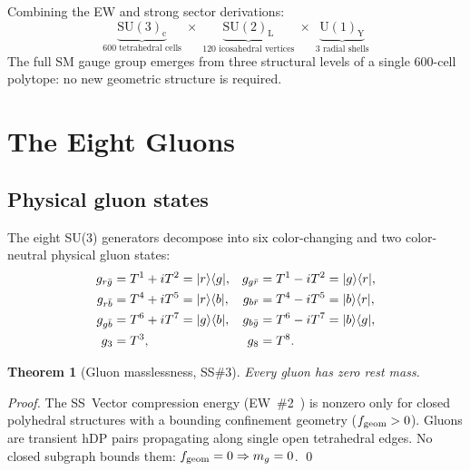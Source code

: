 \documentclass[11pt,letterpaper]{article}
\newtheorem{theorem}{Theorem}[section]
\newcommand{\ket}[1]{|#1\rangle}
\newcommand{\bra}[1]{\langle#1|}
\begin{document}
Combining the EW and strong sector derivations:
\begin{equation}
\underbrace{\mathrm{SU(3)_c}}_{\text{600 tetrahedral cells}}
\;\times\;
\underbrace{\mathrm{SU(2)_L}}_{\text{120 icosahedral vertices}}
\;\times\;
\underbrace{\mathrm{U(1)_Y}}_{\text{3 radial shells}}
\label{eq:SM_gauge}
\end{equation}
The full SM gauge group emerges from three structural levels of a
single 600-cell polytope: no new geometric structure is required.

\section{The Eight Gluons}
\label{sec:gluons}

\subsection{Physical gluon states}

The eight SU(3) generators decompose into six color-changing and
two color-neutral physical gluon states:
\begin{align}
g_{r\bar{g}} &= T^1+iT^2 = \ket{r}\bra{g}, &
g_{g\bar{r}} &= T^1-iT^2 = \ket{g}\bra{r}, \notag\\
g_{r\bar{b}} &= T^4+iT^5 = \ket{r}\bra{b}, &
g_{b\bar{r}} &= T^4-iT^5 = \ket{b}\bra{r}, \notag\\
g_{g\bar{b}} &= T^6+iT^7 = \ket{g}\bra{b}, &
g_{b\bar{g}} &= T^6-iT^7 = \ket{b}\bra{g}, \notag\\
g_3 &= T^3, & g_8 &= T^8. \label{eq:gluons}
\end{align}

\begin{theorem}[Gluon masslessness, SS\#3]
\label{thm:massless}
Every gluon has zero rest mass.
\end{theorem}

\begin{proof}
The SS~Vector compression energy (EW~\#2~\citep{cpp_ew2})
is nonzero only for closed polyhedral structures with a bounding
confinement geometry ($f_{\rm geom} > 0$).  Gluons are transient
hDP pairs propagating along single open tetrahedral edges.  No
closed subgraph bounds them: $f_{\rm geom} = 0 \Rightarrow m_g = 0$.
\qed
\end{proof}
\end{document}
